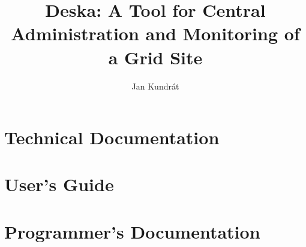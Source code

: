\documentclass{book}
\begin{document}
\title{Deska: A Tool for Central Administration and Monitoring of a Grid Site}

\author{Jan Kundrát}

\maketitle

\setcounter{tocdepth}{3}
\tableofcontents

\part{Technical Documentation}




%

\part{User's Guide}

\part{Programmer's Documentation}



\end{document}
